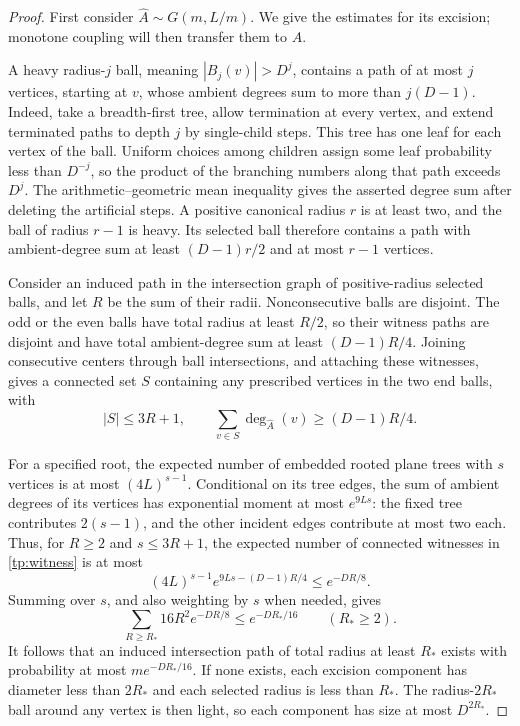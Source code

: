\documentclass[11pt]{article}
\numberwithin{equation}{section}
\begin{document}
\begin{proof}
First consider $\widehat A\sim G(m,L/m)$. We give the estimates for its excision; monotone coupling will then transfer them to $A$.

A heavy radius-$j$ ball, meaning $|B_j(v)|>D^j$, contains a path of at most $j$ vertices, starting at $v$, whose ambient degrees sum to more than $j(D-1)$. Indeed, take a breadth-first tree, allow termination at every vertex, and extend terminated paths to depth $j$ by single-child steps. This tree has one leaf for each vertex of the ball. Uniform choices among children assign some leaf probability less than $D^{-j}$, so the product of the branching numbers along that path exceeds $D^j$. The arithmetic--geometric mean inequality gives the asserted degree sum after deleting the artificial steps. A positive canonical radius $r$ is at least two, and the ball of radius $r-1$ is heavy. Its selected ball therefore contains a path with ambient-degree sum at least $(D-1)r/2$ and at most $r-1$ vertices.

Consider an induced path in the intersection graph of positive-radius selected balls, and let $R$ be the sum of their radii. Nonconsecutive balls are disjoint. The odd or the even balls have total radius at least $R/2$, so their witness paths are disjoint and have total ambient-degree sum at least $(D-1)R/4$. Joining consecutive centers through ball intersections, and attaching these witnesses, gives a connected set $S$ containing any prescribed vertices in the two end balls, with
\begin{equation}\label{tp:witness}
 |S|\le3R+1,\qquad \sum_{v\in S}\deg_{\widehat A}(v)\ge(D-1)R/4.
\end{equation}

For a specified root, the expected number of embedded rooted plane trees with $s$ vertices is at most $(4L)^{s-1}$. Conditional on its tree edges, the sum of ambient degrees of its vertices has exponential moment at most $e^{9Ls}$: the fixed tree contributes $2(s-1)$, and the other incident edges contribute at most two each. Thus, for $R\ge2$ and $s\le3R+1$, the expected number of connected witnesses in \eqref{tp:witness} is at most
\[
 (4L)^{s-1}e^{9Ls-(D-1)R/4}\le e^{-DR/8}.
\]
Summing over $s$, and also weighting by $s$ when needed, gives
\begin{equation}\label{tp:witness-tail}
 \sum_{R\ge R_*}16R^2e^{-DR/8}\le e^{-DR_*/16}
 \qquad(R_*\ge2).
\end{equation}
It follows that an induced intersection path of total radius at least $R_*$ exists with probability at most $me^{-DR_*/16}$. If none exists, each excision component has diameter less than $2R_*$ and each selected radius is less than $R_*$. The radius-$2R_*$ ball around any vertex is then light, so each component has size at most $D^{2R_*}$.


\end{proof}
\end{document}
